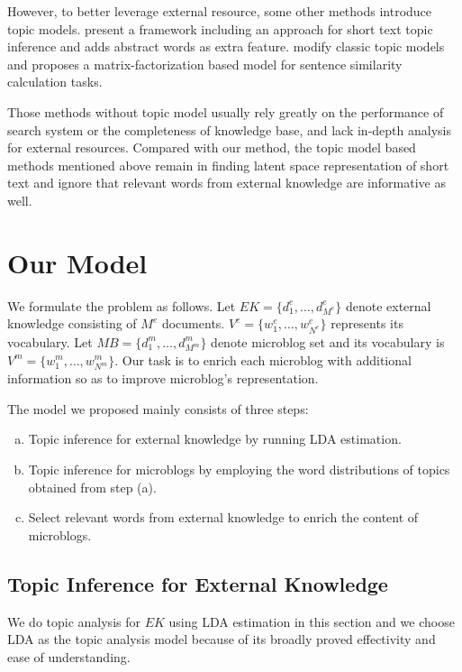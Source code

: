 \documentclass[11pt]{article}
\begin{document}
However, to better leverage external resource, some other methods introduce topic models.  present a framework including an approach for short text topic inference and adds abstract words as extra feature.  modify classic topic models and proposes a matrix-factorization based model for sentence similarity calculation tasks.

Those methods without topic model usually rely greatly on the performance of search system or the completeness of knowledge base, and lack in-depth analysis for external resources. Compared with our method, the topic model based methods mentioned above remain in finding latent space representation of short text and ignore that relevant words from external knowledge are informative as well.

\section{Our Model}

We formulate the problem as follows. Let $EK=\{d^{e}_{1},\ldots,d^{e}_{M^{e}}\}$ denote external knowledge consisting of $M^{e}$ documents. $V^{e}=\{w^{e}_{1},\ldots,w^{e}_{N^{e}}\}$ represents its vocabulary. Let $MB=\{d^{m}_{1},\ldots,d^{m}_{M^{m}}\}$ denote microblog set and its vocabulary is $V^{m}=\{w^{m}_{1},\ldots,w^{m}_{N^{m}}\}$. Our task is to enrich each microblog with additional information so as to improve microblog's representation.

The model we proposed mainly consists of three steps:
\begin{enumerate}[(a)]
\item Topic inference for external knowledge by running LDA estimation.
\item Topic inference for microblogs by employing the word distributions of topics obtained from step (a).
\item Select relevant words from external knowledge to enrich the content of microblogs.
\end{enumerate}

\subsection{Topic Inference for External Knowledge}\label{step_a}

We do topic analysis for $EK$ using LDA estimation \cite{Blei:03} in this section and we choose LDA as the topic analysis model because of its broadly proved effectivity and ease of understanding.
\end{document}

